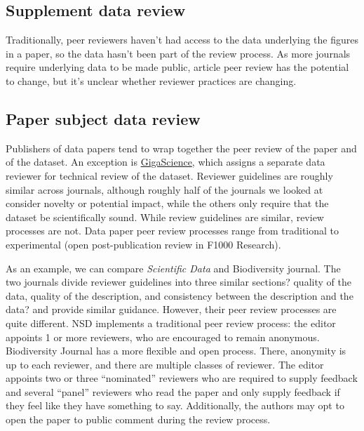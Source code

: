\documentclass[10pt,a4paper,twocolumn]{article}
\begin{document}
\subsection*{Supplement data review}
Traditionally, peer reviewers haven't had access to the data underlying the figures in a paper, so the data hasn't been part of the review process.
As more journals require underlying data to be made public, article peer review has the potential to change, but it's unclear whether reviewer practices are changing.

\subsection*{Paper subject data review}
Publishers of data papers tend to wrap together the peer review of the paper and of the dataset. 
An exception is \href{http://www.gigasciencejournal.com/}{GigaScience}, which assigns a separate data reviewer for technical review of the dataset. 
Reviewer guidelines are roughly similar across journals, although roughly half of the journals we looked at consider novelty or potential impact, while the others only require that the dataset be scientifically sound.
While review guidelines are similar, review processes are not. 
Data paper peer review processes range from traditional to experimental (open post-publication review in F1000 Research).

As an example, we can compare \emph{Scientific Data} and Biodiversity journal.
The two journals divide reviewer guidelines into three similar sections? quality of the data, quality of the description, and consistency between the description and the data? and provide similar guidance.
However, their peer review processes are quite different.
NSD implements a traditional peer review process: the editor appoints 1 or more reviewers, who are encouraged to remain anonymous.
Biodiversity Journal has a more flexible and open process.
There, anonymity is up to each reviewer, and there are multiple classes of reviewer.
The editor appoints two or three ``nominated'' reviewers who are required to supply feedback and several ``panel'' reviewers who read the paper and only supply feedback if they feel like they have something to say.
Additionally, the authors may opt to open the paper to public comment during the review process.
\end{document}
